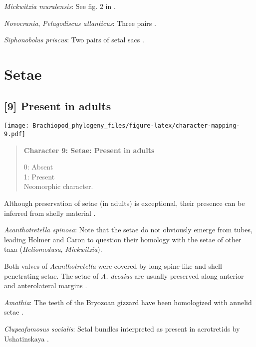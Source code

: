 \documentclass[openany]{book}
\theoremstyle{definition}
\theoremstyle{definition}
\theoremstyle{definition}
\theoremstyle{remark}
\begin{document}
\hypertarget{Mickwitzia_muralensis-coding-8}{}
\emph{Mickwitzia muralensis}: See fig. 2 in
\citet{Balthasar2009Thebrachiopod}.

\hypertarget{Novocrania-coding-8}{}
\emph{Novocrania}, \emph{Pelagodiscus atlanticus}: Three pairs
\citep{Carlson1995Phylogeneticrelationships}.

\hypertarget{Siphonobolus_priscus-coding-8}{}
\emph{Siphonobolus priscus}: Two pairs of setal sacs
\citep{Popov2009Earlyontogeny}.

\section{Setae}\label{setae}

\subsection*{{[}9{]} Present in adults}\label{present-in-adults}

\texttt{[image: Brachiopod\_phylogeny\_files/figure-latex/character-mapping-9.pdf]}

\begin{quote}
\textbf{Character 9: Setae: Present in adults}

0: Absent\\
1: Present\\
Neomorphic character.
\end{quote}

Although preservation of setae (in adults) is exceptional, their
presence can be inferred from shelly material
\citep[see][]{Holmer2006Aspinose}.

\hypertarget{Acanthotretella_spinosa-coding-9}{}
\emph{Acanthotretella spinosa}: Note that the setae do not obviously
emerge from tubes, leading Holmer and Caron to question their homology
with the setae of other taxa (\emph{Heliomedusa}, \emph{Mickwitzia}).

Both valves of \emph{Acanthotretella} were covered by long spine-like
and shell penetrating setae. The setae of \emph{A. decaius} are usually
preserved along anterior and anterolateral margins
\citep{Hu2010Softpart}.

\hypertarget{Amathia-coding-9}{}
\emph{Amathia}: The teeth of the Bryozoan gizzard have been homologized
with annelid setae \citep{Gordon1975}.

\hypertarget{Clupeafumosus_socialis-coding-9}{}
\emph{Clupeafumosus socialis}: Setal bundles interpreted as present in
acrotretids by Ushatinskaya \citeyearpar{Ushatinskaya2016Protegulumand}.
\end{document}
